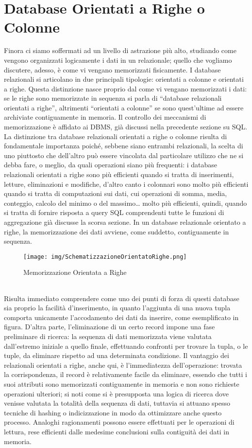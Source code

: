 \documentclass[a4paper,12pt]{report}
\begin{document}
\section{Database Orientati a Righe o Colonne}
Finora ci siamo soffermati ad un livello di astrazione più alto, studiando come vengono organizzati logicamente i dati in un relazionale; quello che vogliamo discutere, adesso, è come vi vengano memorizzati fisicamente. I database relazionali si articolano in due principali tipologie: orientati a colonne e orientati a righe. Questa distinzione nasce proprio dal come vi vengano memorizzati i dati: se le righe sono memorizzate in sequenza si parla di “database relazionali orientati a righe”, altrimenti “orientati a colonne” se sono quest’ultime ad essere archiviate contiguamente in memoria. Il controllo dei meccanismi di memorizzazione è affidato ai DBMS, già discussi nella precedente sezione su SQL. La distinzione tra database relazionali orientati a righe o colonne risulta di fondamentale importanza poiché, sebbene siano entrambi relazionali, la scelta di uno piuttosto che dell’altro può essere vincolata dal particolare utilizzo che ne si debba fare, o meglio, da quali operazioni siano più frequenti: i database relazionali orientati a righe sono più efficienti quando si tratta di inserimenti, letture, eliminazioni e modifiche, d’altro canto i colonnari sono molto più efficienti quando si tratta di computazioni sui dati, cui operazioni di somma, media, conteggio, calcolo del minimo o del massimo… molto più efficienti, quindi, quando si tratta di fornire risposta a query SQL comprendenti tutte le funzioni di aggregazione  già discusse la scorsa sezione. In un database relazionale orientato a righe, la memorizzazione dei dati avviene, come suddetto, contiguamente in sequenza.
\begin{figure}[h]
    \centering
    \texttt{[image: img/SchematizzazioneOrientatoRighe.png]}
    \caption{Memorizzazione Orientata a Righe}
\end{figure}
\\[0ex]
Risulta immediato comprendere come uno dei punti di forza di questi database sia proprio la facilità d’inserimento, in quanto l’aggiunta di una nuova tupla comporta unicamente l’accodamento dei dati da inserire, come esemplificato in figura.
D’altra parte, l’eliminazione di un certo record impone una fase preliminare di ricerca: la sequenza di dati memorizzata viene valutata dall’estremo iniziale a quello finale, effettuando confronti per trovare la tupla, o le tuple, da eliminare rispetto ad una determinata condizione. Il vantaggio dei relazionali orientati a righe, anche qui, è l’immediatezza dell’operazione: trovata la corrispondenza, il record è relativamente facile da eliminare, essendo che tutti i suoi attributi sono memorizzati contiguamente in memoria e non sono richieste operazioni ulteriori; si noti come si è presupposta una logica di ricerca dove venisse valutata la totalità della sequenza di dati, tuttavia si attuano spesso tecniche di hashing o indicizzazione in modo da ottimizzare anche questo processo. Analoghi ragionamenti possono essere effettuati per le operazioni di lettura, rese efficienti dalle medesime conclusioni sulla contiguità dei dati in memoria.
\end{document}
